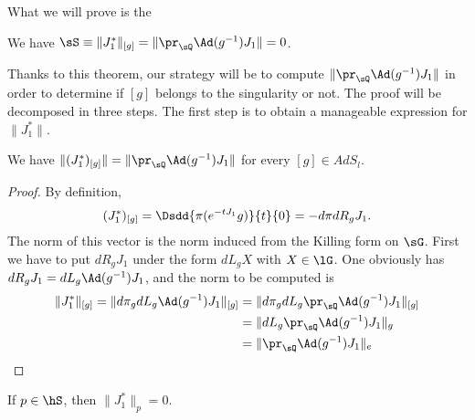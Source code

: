 What we will prove is the
\begin{theorem}        \label{LONGThosSequivJzero}
    We have $\sS\equiv \| J_1^* \|_{[g]}=\| \pr_{\sQ}\Ad(g^{-1})J_1 \|=0$.
\end{theorem}

Thanks to this theorem, our strategy will be to compute $\| \pr_{\sQ}\Ad(g^{-1})J_1 \|$ in order to determine if $[g]$ belongs to the singularity or not. The proof will be decomposed in three steps. The first step is to obtain a manageable expression for $\| J_1^* \|$.

\begin{lemma}        \label{LONGLemExpressionCoolNormJUn}
    We have $\| (J_1^*)_{[g]} \|=\| \pr_{\sQ}\Ad(g^{-1})J_1 \|$ for every $[g]\in AdS_l$.
\end{lemma}




\begin{proof}
    By definition,
    \begin{equation}
        (J_1^*)_{[g]}=\Dsdd{ \pi( e^{-tJ_1}g) }{t}{0}=-d\pi dR_g J_1.
    \end{equation}
    The norm of this vector is the norm induced from the Killing form on $\sG$\cite{Kerin}. First we have to put $dR_g J_1$ under the form $dL_g X$ with $X\in \lG$. One obviously has $dR_g J_1=dL_g\Ad(g^{-1})J_1$, and the norm to be computed is
    \begin{equation}
        \begin{aligned}[]
            \| J_1^* \|_{[g]}=\| d\pi_gdL_g\Ad(g^{-1})J_1\|_{[g]}&=  \|  d\pi_gdL_g\pr_{\sQ}\Ad(g^{-1})J_1\|_{[g]}\\
            &= \| dL_g\pr_{\sQ}\Ad(g^{-1})J_1 \|_{g} \\
            &=\| \pr_{\sQ}\Ad(g^{-1})J_1 \|_e
        \end{aligned}
    \end{equation}
\end{proof}


\begin{proposition}        \label{LONGPropPtpsSjzero}
    If $p\in\hS$, then $\| J_1^* \|_p=0$.
\end{proposition}

